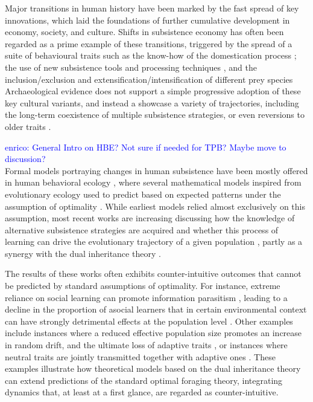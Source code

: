 \documentclass[preprint,authoryear]{elsarticle}
\newcommand{\memo}[2]{\textcolor{#1}{#2}}
\newcommand{\enrico}[1]{\memo{blue}{enrico: #1\\}}
\begin{document}
Major transitions in human history have been marked by the fast spread of key innovations, which laid the foundations of further cumulative development in economy, society, and culture. Shifts in subsistence economy has often been regarded as a prime example of these transitions, triggered by the spread of a suite of behavioural traits such as the know-how of the domestication process \citep{barker2006}; the use of new subsistence tools %
and processing techniques \citep{molleson1993}, and the inclusion/exclusion and extensification/intensification of different prey species %
Archaeological evidence does  not support a simple progressive adoption of these key cultural variants, and instead a showcase a variety of trajectories, including the long-term coexistence of multiple subsistence strategies, or even reversions to older traits \citep{rowley2001}.  

\enrico{General Intro on HBE? Not sure if needed for TPB? Maybe move to discussion?}
Formal models portraying changes in human subsistence have been mostly offered in human behavioral ecology \citep{smith1992,bird2006,kennett2006}, where several mathematical models inspired from evolutionary ecology %
 used to predict  based on expected patterns under the assumption of optimality \citep{belovsky1988}. 
While earliest models relied almost exclusively on this assumption, most recent works are increasing discussing how the knowledge of alternative subsistence strategies are acquired %
and whether this process of learning can drive the evolutionary trajectory of a given population \citep{henrich1998}, partly as a synergy with the dual inheritance theory \citep{boyd1985}. 

The results of these works often exhibits counter-intuitive outcomes that cannot be predicted by standard assumptions of optimality. For instance, extreme reliance on social learning can promote information parasitism \citep{giraldeau2002}, leading to a decline in the proportion of asocial learners that in certain environmental context can have strongly detrimental effects at the population level \citep{whitehead2009}. Other examples include instances where a reduced effective population size promotes an increase in random drift, and the ultimate loss of adaptive traits \citep{henrich2004}, or instances where neutral traits are jointly transmitted together with adaptive ones \citep{ackland2007}. These examples illustrate how theoretical models based on the dual inheritance theory can extend predictions of the standard optimal foraging theory, integrating dynamics that, at least at a first glance, are regarded as counter-intuitive. 
\end{document}
